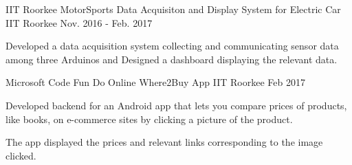 \begin{cventries}
\cventry
    {IIT Roorkee MotorSports} %
    {Data Acquisiton and Display System for Electric Car} %
    {IIT Roorkee} %
    {Nov. 2016 - Feb. 2017} %
    {
      \begin{cvitems} %
        \item {Developed a data acquisition system collecting and communicating sensor data among three Arduinos and Designed a dashboard displaying the relevant data.}
      \end{cvitems}
    }

\cventry
    {Microsoft Code Fun Do Online} %
    {Where2Buy App} %
    {IIT Roorkee} %
    {Feb 2017} %
    {
      \begin{cvitems} %
        \item {Developed backend for an Android app that lets you compare prices of products, like books, on e-commerce sites by clicking a picture of the product.
        }
        \item {
        The app displayed the prices and relevant links corresponding to the image clicked.
        }
      \end{cvitems}
    }

\end{cventries}
